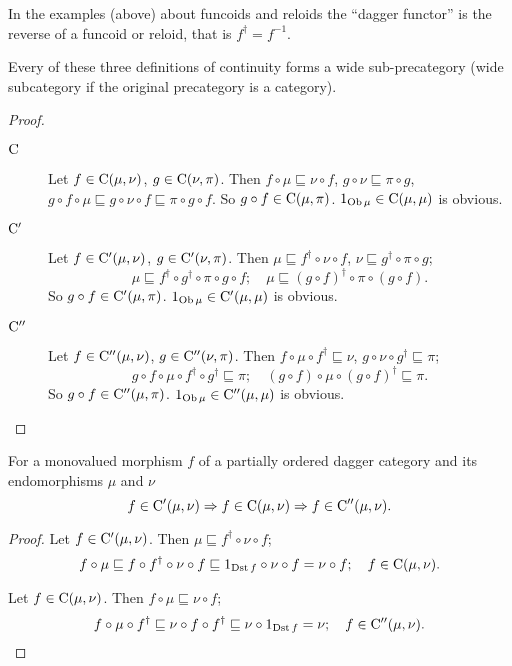 \begin{rem}
In the examples (above) about funcoids and reloids the ``dagger functor''
is the reverse of a funcoid or reloid, that is $f^{\dagger}=f^{-1}$.\end{rem}
\begin{prop}
Every of these three definitions of continuity forms a wide sub-precategory
(wide subcategory if the original precategory is a category).\end{prop}
\begin{proof}
~
\begin{description}
\item [{$\mathrm{C}$}] Let $f\in\mathrm{C}(\mu,\nu)$, $g\in\mathrm{C}(\nu,\pi)$.
Then $f\circ\mu\sqsubseteq\nu\circ f$, $g\circ\nu\sqsubseteq\pi\circ g$,
$g\circ f\circ\mu\sqsubseteq g\circ\nu\circ f\sqsubseteq\pi\circ g\circ f$.
So $g\circ f\in\mathrm{C}(\mu,\pi)$. $1_{\operatorname{Ob}\mu}\in\mathrm{C}(\mu,\mu)$
is obvious.
\item [{$\mathrm{C}'$}] Let $f\in\mathrm{C}'(\mu,\nu)$, $g\in\mathrm{C}'(\nu,\pi)$.
Then $\mu\sqsubseteq f^{\dagger}\circ\nu\circ f$, $\nu\sqsubseteq g^{\dagger}\circ\pi\circ g$;
\[
\mu\sqsubseteq f^{\dagger}\circ g^{\dagger}\circ\pi\circ g\circ f;\quad\mu\sqsubseteq(g\circ f)^{\dagger}\circ\pi\circ(g\circ f).
\]
So $g\circ f\in\mathrm{C}'(\mu,\pi)$. $1_{\operatorname{Ob}\mu}\in\mathrm{C}'(\mu,\mu)$
is obvious.
\item [{$\mathrm{C}''$}] Let $f\in\mathrm{C}''(\mu,\nu)$, $g\in\mathrm{C}''(\nu,\pi)$.
Then $f\circ\mu\circ f^{\dagger}\sqsubseteq\nu$, $g\circ\nu\circ g^{\dagger}\sqsubseteq\pi$;
\[
g\circ f\circ\mu\circ f^{\dagger}\circ g^{\dagger}\sqsubseteq\pi;\quad(g\circ f)\circ\mu\circ(g\circ f)^{\dagger}\sqsubseteq\pi.
\]
So $g\circ f\in\mathrm{C}''(\mu,\pi)$. $1_{\operatorname{Ob}\mu}\in\mathrm{C}''(\mu,\mu)$
is obvious.
\end{description}
\end{proof}
\begin{prop}
For a monovalued morphism $f$ of a partially ordered dagger category
and its endomorphisms $\mu$ and $\nu$ 
\[
f\in\mathrm{C}'(\mu,\nu)\Rightarrow f\in\mathrm{C}(\mu,\nu)\Rightarrow f\in\mathrm{C}''(\mu,\nu).
\]
\end{prop}
\begin{proof}
Let $f\in\mathrm{C}'(\mu,\nu)$. Then $\mu\sqsubseteq f^{\dagger}\circ\nu\circ f$;
\[
f\circ\mu\sqsubseteq f\circ f^{\dagger}\circ\nu\circ f\sqsubseteq1_{\operatorname{Dst} f}\circ\nu\circ f=\nu\circ f;\quad f\in\mathrm{C}(\mu,\nu).
\]


Let $f\in\mathrm{C}(\mu,\nu)$. Then $f\circ\mu\sqsubseteq\nu\circ f$;
\[
f\circ\mu\circ f^{\dagger}\sqsubseteq\nu\circ f\circ f^{\dagger}\sqsubseteq\nu\circ1_{\operatorname{Dst} f}=\nu;\quad f\in\mathrm{C}''(\mu,\nu).
\]
\end{proof}
